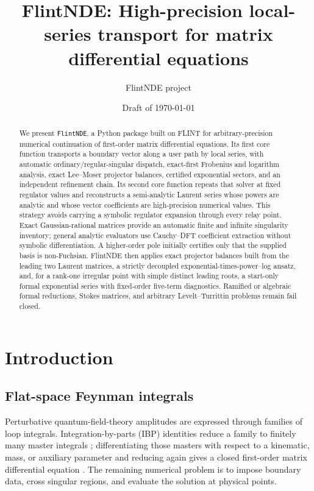 \documentclass[11pt]{article}
\title{FlintNDE: High-precision local-series transport for matrix differential equations}
\author{FlintNDE project}
\date{Draft of \today}
\begin{document}
\maketitle

\begin{abstract}
We present \texttt{FlintNDE}, a Python package built on FLINT for arbitrary-precision
numerical continuation of first-order matrix differential equations.  Its first core
function transports a boundary vector along a user path by local series, with automatic
ordinary/regular-singular dispatch, exact-first Frobenius and logarithm analysis, exact
Lee--Moser projector balances, certified exponential sectors, and an independent refinement chain.  Its
second core function repeats that solver at fixed
regulator values and reconstructs a semi-analytic Laurent series whose powers are analytic
and whose vector coefficients are high-precision numerical values.  This strategy avoids
carrying a symbolic regulator expansion through every relay point.  Exact
Gaussian-rational matrices provide an automatic finite and infinite singularity inventory;
general analytic evaluators use Cauchy--DFT coefficient extraction without symbolic
differentiation.  A higher-order pole initially certifies only that the supplied basis is
non-Fuchsian.  FlintNDE then applies exact projector balances built from the leading two
Laurent matrices, a strictly decoupled exponential-times-power--log ansatz, and, for a
rank-one irregular point with simple distinct leading roots, a start-only formal exponential
series with fixed-order five-term diagnostics.  Ramified or algebraic formal reductions,
Stokes matrices, and arbitrary Levelt--Turrittin problems remain fail closed.
\end{abstract}

\section{Introduction}

\subsection{Flat-space Feynman integrals}

Perturbative quantum-field-theory amplitudes are expressed through families of loop
integrals.  Integration-by-parts (IBP) identities reduce a family to finitely many master
integrals \cite{Chetyrkin:1981qh}; differentiating those masters with respect to a
kinematic, mass, or auxiliary parameter and reducing again gives a closed first-order
matrix differential equation \cite{Gehrmann:1999as}.  The remaining numerical problem is
to impose boundary data, cross singular regions, and evaluate the solution at physical
points.
\end{document}
